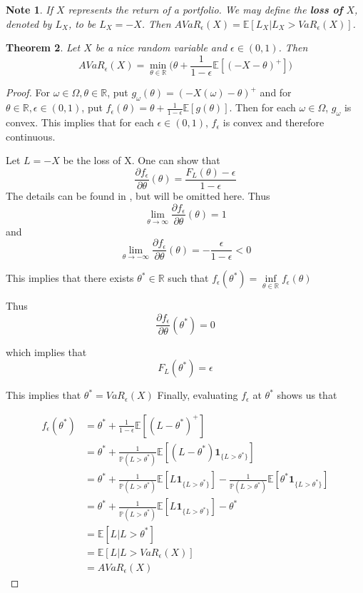 \documentclass[12pt]{amsart}
\newtheorem{thm}{Theorem}[section]
\newtheorem{note}[thm]{Note}
\newcommand{\ep}{\epsilon}
\newcommand{\om}{\omega}
\newcommand{\Om}{\Omega}
\newcommand{\E}{\mathbb{E}}
\newcommand{\R}{\mathbb{R}}
\renewcommand{\P}{\mathbb{P}}
\begin{document}
\begin{note}
If $X$ represents the return of a portfolio. We may define the \textbf{loss of} $X$, denoted by $L_X$, to be $L_X = -X$. Then $AVaR_{\ep}(X) = \E[L_X|L_X>VaR_{\ep}(X)]$.  
\end{note}

\begin{thm}
Let $X$ be a nice random variable and $\ep \in (0,1)$. Then $$AVaR_{\ep}(X) = \min_{\theta \in \R} \bigg(\theta + \frac{1}{1-\ep}\E[(-X - \theta)^+]\bigg)$$
\end{thm}

\begin{proof} 
For $\om \in \Om, \theta \in \R$, put $g_{\om}(\theta) = (-X(\om) - \theta)^+$ and for $\theta \in \R, \ep \in (0,1)$, put $f_{\ep}(\theta) = \theta + \frac{1}{1-\ep}\E[g(\theta)]$. Then for each $\om \in \Om$, $g_{\om}$ is convex. This implies that for each $\ep \in (0,1)$, $f_{\ep}$ is convex and therefore continuous.

Let $L = -X$ be the loss of X.  One can show that $$\frac{\partial f_{\ep}}{\partial \theta}(\theta) = \frac{F_L(\theta) -\ep}{1-\ep} $$ The details can be found in \cite{RockUr}, but will be omitted here. Thus $$\lim_{\theta \rightarrow \infty}\frac{\partial f_{\ep}}{\partial \theta}(\theta) = 1$$ and $$\lim_{\theta \rightarrow -\infty} \frac{\partial f_{\ep}}{\partial \theta}(\theta) = - \frac{\ep}{1-\ep} <0$$

This implies that there exists $\theta^* \in \R$ such that $f_{\ep}(\theta^*) = \inf\limits_{\theta \in \R}f_{\ep}(\theta)$

Thus $$\frac{\partial f_{\ep}}{\partial \theta}(\theta^*) = 0$$

which implies that $$F_L(\theta^*) = \ep$$

This implies that $\theta^* = VaR_{\ep}(X)$ Finally, evaluating $f_{\ep}$ at $\theta^*$ shows us that 

\begin{align*}
f_{\ep}(\theta^*)  
&=  \theta^* + \frac{1}{1- \epsilon}\E[(L - \theta^*)^+]\\
& = \theta^* + \frac{1}{\P(L>\theta^*)}\E[(L-\theta^*)\mathbf{1}_{\{L>\theta^*\}}] \\
& = \theta^* + \frac{1}{\P(L>\theta^*)}\E[L\mathbf{1}_{\{L>\theta^*\}}] - \frac{1}{\P(L>\theta^*)}\E[\theta^*\mathbf{1}_{\{L>\theta^*\}}] \\
& = \theta^* + \frac{1}{\P(L>\theta^*)}\E[L\mathbf{1}_{\{L>\theta^*\}}] - \theta^* \\
&= \E[L|L> \theta^*] \\
& = \E[L|L>VaR_{\ep}(X)] \\
& = AVaR_{\ep}(X)
\end{align*}

\end{proof}
\end{document}
